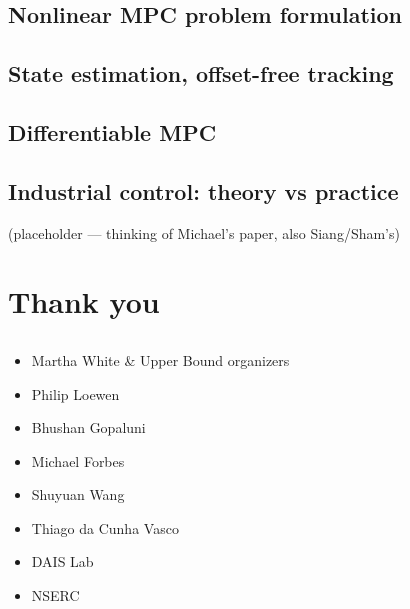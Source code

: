 \documentclass[
  letterpaper,
  DIV=11,
  numbers=noendperiod,
  oneside]{scrartcl}
\providecommand{\tightlist}{%
  \setlength{\itemsep}{0pt}\setlength{\parskip}{0pt}}\usepackage{longtable,booktabs,array}
\begin{document}

\subsection{Nonlinear MPC problem
formulation}\label{nonlinear-mpc-problem-formulation}

\subsection{State estimation, offset-free
tracking}\label{state-estimation-offset-free-tracking}

\subsection{Differentiable MPC}\label{differentiable-mpc}

\subsection{Industrial control: theory vs
practice}\label{industrial-control-theory-vs-practice}

(placeholder --- thinking of Michael's paper, also Siang/Sham's)

\section{Thank you}\label{thank-you}

\subsection{}\label{section-63}

\begin{itemize}
\tightlist
\item
  Martha White \& Upper Bound organizers
\item
  Philip Loewen
\item
  Bhushan Gopaluni
\item
  Michael Forbes
\item
  Shuyuan Wang
\item
  Thiago da Cunha Vasco
\item
  DAIS Lab
\item
  NSERC
\end{itemize}
\end{document}
